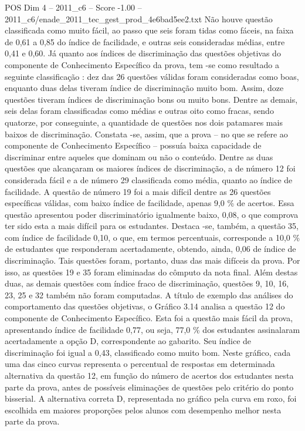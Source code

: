 \begin{textsample}{POS Dim 4 – 2011\_c6 – Score -1.00 – 2011\_c6/enade\_2011\_tec\_gest\_prod\_4e6bad5ee2.txt}
Não houve questão classificada como muito fácil, ao passo que seis foram tidas como fáceis, na faixa de 0,61 a 0,85 do índice de facilidade, e outras seis consideradas médias, entre 0,41 e 0,60.
Já quanto aos índices de discriminação das questões objetivas do componente de Conhecimento Específico da prova, tem -se como resultado a seguinte classificação : dez das 26 questões válidas foram consideradas como boas, enquanto duas delas tiveram índice de discriminação muito bom.
Assim, doze questões tiveram índices de discriminação bons ou muito bons.
Dentre as demais, seis delas foram classificadas como médias e outras oito como fracas, sendo quatorze, por conseguinte, a quantidade de questões nos dois patamares mais baixos de discriminação.
Constata -se, assim, que a prova – no que se refere ao componente de Conhecimento Específico – possuía baixa capacidade de discriminar entre aqueles que dominam ou não o conteúdo.
Dentre as duas questões que alcançaram os maiores índices de discriminação, a de número 12 foi considerada fácil e a de número 29 classificada como média, quanto ao índice de facilidade.
A questão de número 19 foi a mais difícil dentre as 26 questões específicas válidas, com baixo índice de facilidade, apenas 9,0 \% de acertos.
Essa questão apresentou poder discriminatório igualmente baixo, 0,08, o que comprova ter sido esta a mais difícil para os estudantes.
Destaca -se, também, a questão 35, com índice de facilidade 0,10, o que, em termos percentuais, corresponde a 10,0 \% de estudantes que responderam acertadamente, obtendo, ainda, 0,06 de índice de discriminação.
Tais questões foram, portanto, duas das mais difíceis da prova.
Por isso, as questões 19 e 35 foram eliminadas do cômputo da nota final.
Além destas duas, as demais questões com índice fraco de discriminação, questões 9, 10, 16, 23, 25 e 32 também não foram computadas.
A título de exemplo das análises do comportamento das questões objetivas, o Gráfico 3.14 analisa a questão 12 do componente de Conhecimento Específico.
Esta foi a questão mais fácil da prova, apresentando índice de facilidade 0,77, ou seja, 77,0 \% dos estudantes assinalaram acertadamente a opção D, correspondente ao gabarito.
Seu índice de discriminação foi igual a 0,43, classificado como muito bom.
Neste gráfico, cada uma das cinco curvas representa o percentual de respostas em determinada alternativa da questão 12, em função do número de acertos dos estudantes nesta parte da prova, antes de possíveis eliminações de questões pelo critério do ponto bisserial.
A alternativa correta D, representada no gráfico pela curva em roxo, foi escolhida em maiores proporções pelos alunos com desempenho melhor nesta parte da prova.

\end{textsample}
